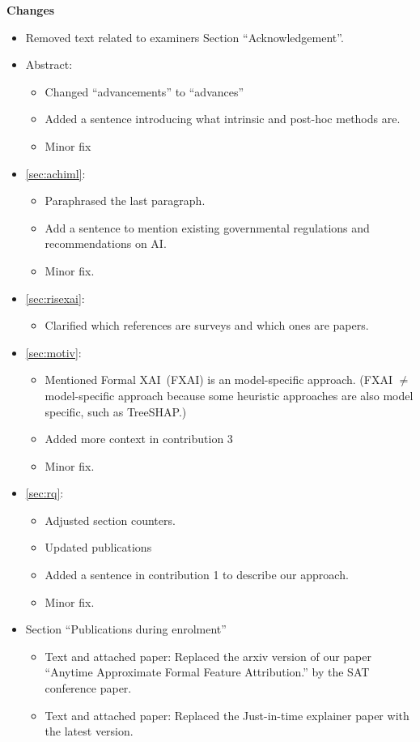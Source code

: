 \color{blue}
\textbf{Changes}

\begin{itemize}
	\item Removed text related to examiners Section ``Acknowledgement''.
	\item Abstract:
		\begin{itemize}
			\item Changed ``advancements'' to ``advances''
			\item Added a sentence introducing what intrinsic and post-hoc methods are.
			\item Minor fix
		\end{itemize}
	\item \autoref{sec:achiml}:
		\begin{itemize}
			\item Paraphrased the last paragraph.
			\item Add a sentence to mention existing governmental regulations and
				recommendations on AI.
				\item Minor fix.
		\end{itemize}
	\item \autoref{sec:risexai}:
		\begin{itemize}
			\item Clarified which references are surveys and which ones are papers.
		\end{itemize}
	\item \autoref{sec:motiv}:
		\begin{itemize}
			\item Mentioned Formal XAI~(FXAI) is an model-specific approach. (FXAI
				$\neq$ model-specific approach because some heuristic approaches are
				also model specific, such as TreeSHAP.)
			\item Added more context in contribution 3
			\item Minor fix.
		\end{itemize}
	\item \autoref{sec:rq}:
		\begin{itemize}
			\item Adjusted section counters.
			\item Updated publications
			\item Added a sentence in contribution 1 to describe our approach.
			\item Minor fix.
		\end{itemize}
	\item Section ``Publications during enrolment''
		\begin{itemize}
			\item Text and attached paper: Replaced the arxiv version of our paper ``Anytime Approximate Formal
				Feature Attribution.'' by the SAT conference paper.
			\item Text and attached paper: Replaced the Just-in-time explainer paper
				with the latest version. 
		\end{itemize}


\end{itemize}
